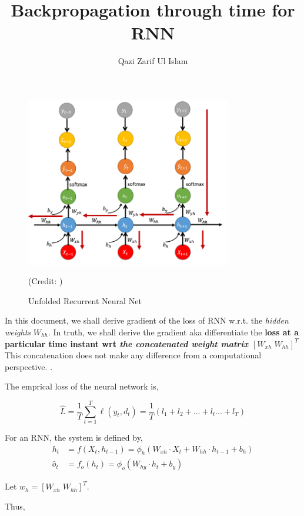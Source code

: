 \documentclass[12pt, letterpaper]{article}
\title{Backpropagation through time for RNN}
\author{Qazi Zarif Ul Islam}
\begin{document}
\maketitle

\begin{figure}[htpb]
    \centering
    \includegraphics[width=0.8\textwidth]{rnn.png}
    \caption*{Unfolded Recurrent Neural Net} (Credit: \cite{murat_bptt})
    \label{fig: rnn}
\end{figure}

In this document, we shall derive gradient of the loss of RNN
w.r.t. the \textit{hidden weights} $W_{hh}$. In truth, we shall
derive the gradient aka differentiate the \textbf{loss at a particular
time instant wrt \textit{the concatenated weight matrix $[W_{xh}\;W_{hh}]^T$}}
This concatenation does not make any difference from a computational
perspective. \cite{d2l_bptt, murat_bptt}.

The emprical loss of the neural network is,

\begin{equation}
    \hat{L} = \frac{1}{T} \sum_{t=1}^{T} \ell(y_t, d_t) = \frac{1}{T} (l_1 + l_2 + ... + l_t ... + l_T)
\end{equation}

For an RNN, the system is defined by,
\begin{align}
    h_{t} &= f (X_{t}, h_{t-1}) = \phi_{h}(W_{xh} \cdot X_{t} + W_{hh}\cdot h_{t-1} +b_{h}) \\
    \hat{o}_{t} &= f_{o}(h_{t}) = \phi_{o}(W_{hy}\cdot h_{t} + b_{y})
\end{align}

Let $w_h = [W_{xh}\;W_{hh}]^T$.

Thus,
\end{document}

